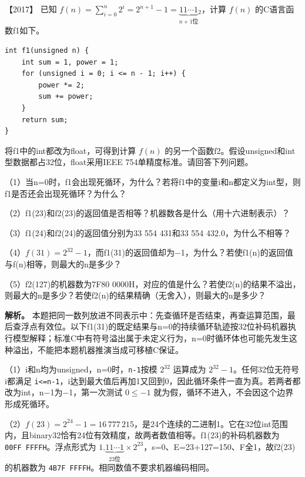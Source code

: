 \noindent{}【2017】 已知 \(f(n)=\sum_{i=0}^{n}2^i=2^{n+1}-1=\underbrace{11\cdots1}_{n+1\text{位}}{}_2\)，计算 \(f(n)\) 的C语言函数f1如下。

\par\medskip\noindent
\begin{minipage}{\linewidth}
\begin{verbatim}
int f1(unsigned n) {
    int sum = 1, power = 1;
    for (unsigned i = 0; i <= n - 1; i++) {
        power *= 2;
        sum += power;
    }
    return sum;
}
\end{verbatim}
\end{minipage}\par\medskip

将f1中的int都改为float，可得到计算 \(f(n)\) 的另一个函数f2。假设unsigned和int型数据都占32位，float采用IEEE 754单精度标准。请回答下列问题。

（1）当n=0时，f1会出现死循环，为什么？若将f1中的变量i和n都定义为int型，则f1是否还会出现死循环？为什么？

（2）f1(23)和f2(23)的返回值是否相等？机器数各是什么（用十六进制表示）？

（3）f1(24)和f2(24)的返回值分别为33 554 431和33 554 432.0，为什么不相等？

（4）\(f(31)=2^{32}-1\)，而f1(31)的返回值却为−1，为什么？若使f1(n)的返回值与f(n)相等，则最大的n是多少？

（5）f2(127)的机器数为7F80 0000H，对应的值是什么？若使f2(n)的结果不溢出，则最大的n是多少？若使f2(n)的结果精确（无舍入），则最大的n是多少？


\textbf{解析。} 本题把同一数列放进不同表示中：先查循环是否结束，再查运算范围，最后查浮点有效位。以下f1(31)的既定结果与n=0的持续循环轨迹按32位补码机器执行模型解释；标准C中有符号溢出属于未定义行为，n=0时循环体也可能先发生这种溢出，不能把本题机器推演当成可移植C保证。

（1）i和n均为unsigned，n=0时，\texttt{n-1}按模 \(2^{32}\) 运算成为 \(2^{32}-1\)。任何32位无符号i都满足 \texttt{i\textless{}=n-1}，i达到最大值后再加1又回到0，因此循环条件一直为真。若两者都改为int，n−1为−1，第一次测试 \(0\le-1\) 就为假，循环不进入，不会因这个边界形成死循环。

（2）\(f(23)=2^{24}-1=16\,777\,215\)，是24个连续的二进制1。它在32位int范围内，且binary32恰有24位有效精度，故两者数值相等。f1(23)的补码机器数为 \texttt{00FF\ FFFFH}。浮点形式为 \(1.\underbrace{11\cdots1}_{23\text{位}}\times2^{23}\)，s=0、E=23+127=150、F全1，故f2(23)的机器数为 \texttt{4B7F\ FFFFH}。相同数值不要求机器编码相同。

